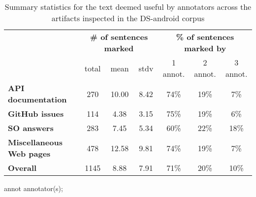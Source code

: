 \begin{table}[H]
\centering    
\caption{Summary statistics for the text deemed useful by annotators across the artifacts inspected in the \acs{DS-android} corpus}
\label{tbl:corpus-annotation-summary}
\begin{scriptsize}
\begin{threeparttable}
\begin{tabular}{lcccccc}





& \multicolumn{3}{c}{\textbf{\# of sentences marked}}
& \multicolumn{3}{c}{\textbf{\% of sentences marked by}}
\\ \cmidrule(l){2-4} \cmidrule(l){5-7} 
& total & mean & stdv 
& 1 annot. & 2 annot. & 3 annot. \\

\hline

\textbf{API documentation} 
& 270 & 10.00 & 8.42
& 74\% & 19\% & 7\%
\\
\textbf{GitHub issues} 
& 114 & 4.38 & 3.15
& 75\% & 19\% & 6\%
\\
\textbf{SO answers} 
& 283 & 7.45 & 5.34
& 60\% & 22\% & 18\%
\\
\textbf{Miscellaneous Web pages} 
& 478 & 12.58 & 9.81
& 74\% & 19\% & 7\%
\\

\hline
\textbf{Overall} 
& 1145 & 8.88 & 7.91
& 71\% & 20\% & 10\%
\\
\hline

\end{tabular}
\begin{tablenotes}
    \item[annot] annotator(s);
\end{tablenotes}
\end{threeparttable}
\end{scriptsize}
\end{table}


